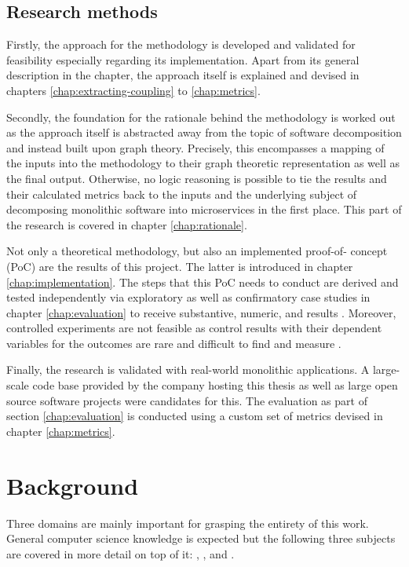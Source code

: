 \documentclass[12pt,a4paper]{report}
\begin{document}
\section{Research methods}

Firstly, the approach for the methodology is developed and validated for
feasibility especially regarding its implementation. Apart from its general
description in the \textit{} chapter, the approach itself
is explained and devised in chapters \ref{chap:extracting-coupling} to \ref{chap:metrics}.

Secondly, the foundation for the rationale behind the methodology is worked out
as the approach itself is abstracted away from the topic of software
decomposition and instead built upon graph theory. Precisely, this encompasses
a mapping of the inputs into the methodology to their graph theoretic
representation as well as the final output. Otherwise, no logic reasoning is
possible to tie the results and their calculated metrics back to the inputs and
the underlying subject of decomposing monolithic software into microservices in
the first place. This part of the research is covered in chapter \ref{chap:rationale}.

Not only a theoretical methodology, but also an implemented proof-of-
concept (PoC) are the results of this project. The latter is introduced in
chapter \ref{chap:implementation}. The steps that this PoC needs to conduct are
derived and tested independently via exploratory as well as confirmatory case
studies in chapter \ref{chap:evaluation} to receive substantive, numeric, and
results \cite{easterbrook2008selecting}. Moreover, controlled
experiments are not feasible as control results with their dependent variables
for the outcomes are rare and difficult to find and measure
\cite{easterbrook2008selecting}.

Finally, the research is validated with real-world monolithic applications. A
large-scale code base provided by the company hosting this thesis as well as
large open source software projects were candidates for this. The evaluation as
part of section \ref{chap:evaluation} is conducted using a custom set of
metrics devised in chapter \ref{chap:metrics}.




\chapter{Background} \label{chap:background}

Three domains are mainly important for grasping the entirety of this work.
General computer science knowledge is expected but the following three subjects
are covered in more detail on top of it: \textit{},
\textit{}, and
\textit{}.
\end{document}
